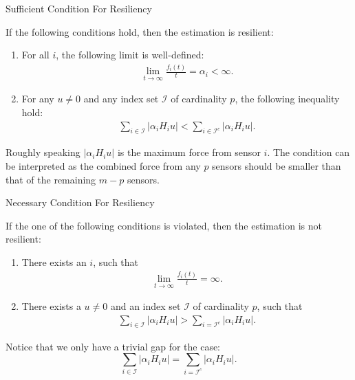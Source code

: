 \documentclass[10pt]{beamer}
\begin{document}
\begin{frame}{Sufficient Condition For Resiliency}
  \begin{theorem}
    If the following conditions hold, then the estimation is resilient:
    \begin{enumerate}
    \item For all $i$, the following limit is well-defined:
      \begin{align*}
        \lim_{t\rightarrow\infty}\frac{f_i(t)}{t} = \alpha_i < \infty.
      \end{align*}
    \item For any $u\neq 0$ and any index set $\mathcal I$ of cardinality $p$, the following inequality hold:
      \begin{align*}
        \sum_{i\in \mathcal I} |\alpha_i H_i u| < \sum_{i\in \mathcal I^c} |\alpha_i H_i u|.
      \end{align*}
    \end{enumerate}
  \end{theorem}
  Roughly speaking $|\alpha_i H_i u|$ is the maximum force from sensor $i$. The condition can be interpreted as the combined force from any $p$ sensors should be smaller than that of the remaining $m-p$ sensors.
\end{frame}

\begin{frame}{Necessary Condition For Resiliency}
  \begin{theorem}
    If the one of the following conditions is violated, then the estimation is not resilient:
    \begin{enumerate}
    \item There exists an $i$, such that
      \begin{align*}
        \lim_{t\rightarrow\infty}\frac{f_i(t)}{t} = \infty.
      \end{align*}
    \item There exists a $u\neq 0$ and an index set $\mathcal I$ of cardinality $p$, such that
      \begin{align*}
        \sum_{i\in \mathcal I} |\alpha_i H_i u| > \sum_{i=\mathcal I^c} |\alpha_i H_i u|.
      \end{align*}
    \end{enumerate}
  \end{theorem}
  Notice that we only have a trivial gap for the case:
  \[ \sum_{i\in \mathcal I} |\alpha_i H_i u| = \sum_{i=\mathcal I^c} |\alpha_i H_i u|.\]
\end{frame}
\end{document}
